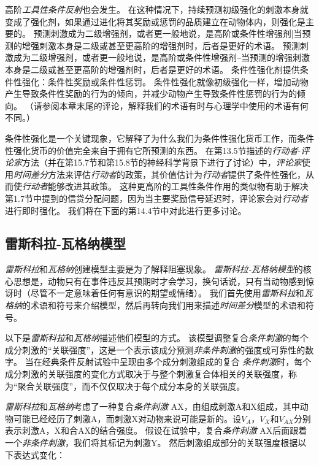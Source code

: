 	
高阶\textit{工具性条件反射}也会发生。
在这种情况下，持续预测初级强化的刺激本身就变成了强化剂，如果通过进化将其奖励或惩罚的品质建立在动物体内，则强化是主要的。
预测刺激成为二级增强剂，或者更一般地说，是高阶或条件性增强剂|当预测的增强刺激本身是二级或甚至更高阶的增强剂时，后者是更好的术语。
预测刺激成为二级增强剂，或者更一般地说，是高阶或条件性增强剂--当预测的增强刺激本身是二级或甚至更高阶的增强剂时，后者是更好的术语。
条件性强化剂提供条件性强化：条件性奖励或条件性惩罚。
条件性强化就像初级强化一样，增加动物产生导致条件性奖励的行为的倾向，并减少动物产生导致条件性惩罚的行为的倾向。
（请参阅本章末尾的评论，解释我们的术语有时与心理学中使用的术语有何不同。）



条件性强化是一个关键现象，它解释了为什么我们为条件性强化货币工作，而条件性强化货币的价值完全来自于拥有它所预测的东西。
在第13.5节描述的\textit{行动者}-\textit{评论家}方法（并在第15.7节和第15.8节的神经科学背景下进行了讨论）中，\textit{评论家}使用\textit{时间差分}方法来评估\textit{行动者}的政策，其价值估计为\textit{行动者}提供了条件性强化，从而使\textit{行动者}能够改进其政策。
这种更高阶的工具性条件作用的类似物有助于解决第1.7节中提到的信贷分配问题，因为当主要奖励信号延迟时，评论家会对\textit{行动者}进行即时强化。
我们将在下面的第14.4节中对此进行更多讨论。


\subsection{雷斯科拉-瓦格纳模型} \label{sec:rescorla_wagner}

\textit{雷斯科拉}和\textit{瓦格纳}创建模型主要是为了解释阻塞现象。
\textit{雷斯科拉-瓦格纳模型}的核心思想是，动物只有在事件违反其预期时才会学习，换句话说，只有当动物感到惊讶时（尽管不一定意味着任何有意识的期望或情绪）。
我们首先使用\textit{雷斯科拉}和\textit{瓦格纳}的术语和符号来介绍模型，然后再转向我们用来描述\textit{时间差分}模型的术语和符号。


以下是\textit{雷斯科拉}和\textit{瓦格纳}描述他们模型的方式。
该模型调整复合\textit{条件刺激}的每个成分刺激的“关联强度”，这是一个表示该成分预测\textit{非条件刺激}的强度或可靠性的数字。
当在经典条件反射试验中呈现由多个成分刺激组成的复合 \textit{条件刺激}时，每个成分刺激的关联强度的变化方式取决于与整个刺激复合体相关的关联强度，称为“聚合关联强度”，而不仅仅取决于每个成分本身的关联强度。


\textit{雷斯科拉}和\textit{瓦格纳}考虑了一种复合\textit{条件刺激} AX，由组成刺激A和X组成，其中动物可能已经经历了刺激A，而刺激X对动物来说可能是新的。设$V_A$，$V_X$和$V_{AX}$分别表示刺激A，X和合AX的结合强度。
假设在试验中，复合\textit{条件刺激} AX后面跟着一个\textit{非条件刺激}，我们将其标记为刺激Y。
然后刺激组成部分的关联强度根据以下表达式变化：

